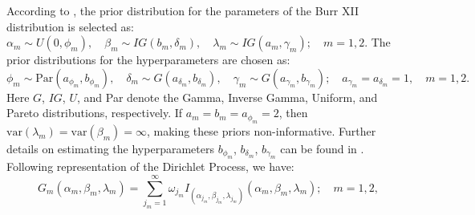\documentclass[twoside]{article}
\begin{document}
According to \cite{HajiJoudaki:2022}, the prior distribution for the parameters of the Burr XII distribution is selected as:
$
\alpha_m \sim U(0, \phi_m), \quad \beta_m \sim IG(b_m, \delta_m), \quad \lambda_m \sim IG(a_m, \gamma_m); \quad m = 1, 2.
$
The prior distributions for the hyperparameters are chosen as:
\[
\phi_m \sim \text{Par}(a_{\phi_m}, b_{\phi_m}), \quad \delta_m \sim G(a_{\delta_m}, b_{\delta_m}), \quad \gamma_m \sim G(a_{\gamma_m}, b_{\gamma_m}); \quad a_{\gamma_m} = a_{\delta_m} = 1, \quad m = 1, 2.
\]
Here \(G\), \(IG\), \(U\), and Par denote the Gamma, Inverse Gamma, Uniform, and Pareto distributions, respectively. If \(a_m = b_m = a_{\phi_m} = 2\), then \(\text{var}(\lambda_m) = \text{var}(\beta_m) = \infty\), making these priors non-informative. Further details on estimating the hyperparameters \(b_{\phi_m}\), \(b_{\delta_m}\), \(b_{\gamma_m}\)  can be found in \cite{HajiJoudaki:2022}.
Following \cite{Sethuraman:1994} representation of the Dirichlet Process, we have:
\begin{equation}\label{eq5}
G_m(\alpha_m, \beta_m, \lambda_m) = \sum_{j_m=1}^{\infty} \omega_{j_m} I_{(\alpha_{j_m}, \beta_{j_m}, \lambda_{j_m})}(\alpha_m, \beta_m, \lambda_m); \quad m = 1, 2,
\end{equation}
\end{document}
